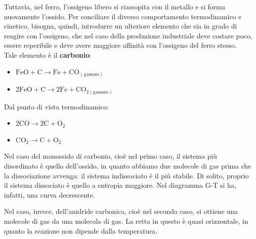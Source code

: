 Tuttavia, nel ferro, l’ossigeno libero si riassopita con il metallo e si forma nuovamente l’ossido. Per conciliare il diverso comportamento termodinamico e cinetico, bisogna, quindi, introdurre un ulteriore elemento che sia in grado di reagire con l’ossigeno, che nel caso della produzione industriale deve costare poco, essere reperibile e deve avere maggiore affinità con l’ossigeno del ferro stesso.\\
Tale elemento è il \textbf{carbonio}:
\begin{itemize}
    \item $\mathrm{FeO+C\to Fe+CO_{(gassoso)}}$
    \item $\mathrm{2FeO+C\to2Fe+CO_{2(gassoso)}}$
\end{itemize}

Dal punto di vista termodinamico:
\begin{itemize}
    \item  $\mathrm{2CO\to2C+O_2}$
    \item $\mathrm{CO_2\to C+O_2}$
\end{itemize}

Nel caso del monossido di carbonio, cioè nel primo caso, il sistema più disordinato è quello dell’ossido, in quanto abbiamo due molecole di gas prima che la dissociazione avvenga: il sistema indissociato è il più stabile. Di solito, proprio il sistema dissociato è quello a entropia maggiore. Nel diagramma G-T si ha, infatti, una curva decrescente.

Nel caso, invece, dell’anidride carbonica, cioè nel secondo caso, si ottiene una molecole di gas da una molecola di gas. La retta in questo è quasi orizzontale, in quanto la reazione non dipende dalla temperatura.

